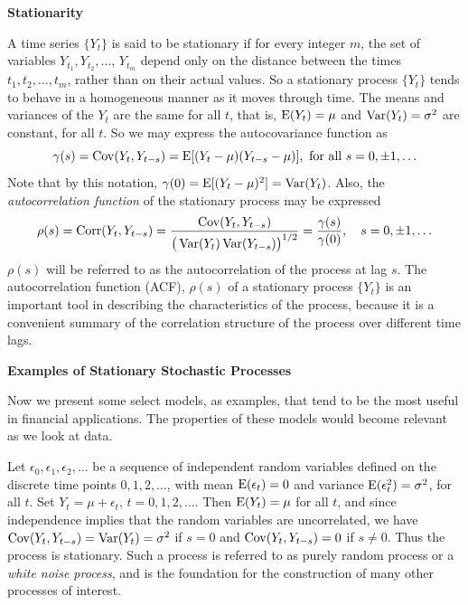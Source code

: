 \noindent\textbf{Stationarity} \twomedskip


A time series $\{Y_t \}$ is said to be stationary if for every integer $m$, the set of variables $Y_{t_1}, Y_{t_2}, \ldots, \, Y_{t_m}$ depend only on the distance between the times $t_1, t_2, \ldots, t_m$, rather than on their actual values.  So a stationary process $\{Y_t \}$ tends to behave in a homogeneous manner as it moves through time. The means and variances of the $Y_t$ are the same for all $t$, that is, $\operatorname{E}(Y_t) = \mu$ and  $\operatorname{Var}(Y_t)= \sigma^2$ are constant, for all $t$. So we may express the autocovariance function as 
	\begin{equation} \label{eqn:2gammas}
	\gamma(s)= \cov(Y_t,Y_{t - s})= \Ex[(Y_t - \mu)(Y_{t - s} - \mu)], \text{ for all } s= 0, \pm 1, \ldots
	\end{equation}
Note that by this notation, $\gamma(0) = \operatorname{E}[(Y_t - \mu)^2] = \operatorname{Var}(Y_t)$. Also, the \emph{autocorrelation function} of the stationary process may be expressed
        	\begin{equation} \label{eqn:2rhos}
	\rho(s)= \corr(Y_t,Y_{t - s})= \dfrac{\cov(Y_t,Y_{t - s})}{\big( \var(Y_t) \var(Y_{t-s}) \big)^{1/2}} = \dfrac{\gamma(s)}{\gamma(0)},  \quad  s= 0, \pm 1, \ldots
	\end{equation}
$\rho(s)$ will be referred to as the autocorrelation of the process at lag $s$. The autocorrelation function (ACF), $\rho(s)$ of a stationary process $\{Y_t\}$ is an important tool in describing the characteristics of the process, because it is a convenient summary of the correlation structure of the process over different time lags.  \twomedskip


\noindent \textbf{Examples of Stationary Stochastic Processes} \twomedskip


Now we present some select models, as examples, that tend to be the most useful in financial applications. The properties of these models would become relevant as we look at data. 


\begin{ex} \label{ex:whitenoise} Let $\epsilon_0, \epsilon_1, \epsilon_2, \ldots$ be a sequence of independent random variables defined on the discrete time points $0,1, 2, \ldots$, with mean $\operatorname{E}(\epsilon_{t})= 0$ and variance $\operatorname{E}(\epsilon_{t}^2)= \sigma^2$, for all $t$. Set $Y_t = \mu + \epsilon_t, \, t= 0, 1, 2, \ldots$. Then $\operatorname{E}(Y_t)= \mu$ for all $t$, and since independence implies that the random variables are uncorrelated, we have $\operatorname{Cov}(Y_t,Y_{t-s})= \operatorname{Var}(Y_t)= \sigma^2$ if $s=0$ and $\operatorname{Cov}(Y_t,Y_{t-s})= 0$ if $s \neq 0$. Thus the process is stationary. Such a process is referred to as purely random process or a \emph{white noise process}, and is the foundation for the construction of many other processes of interest. \xqed
\end{ex}


